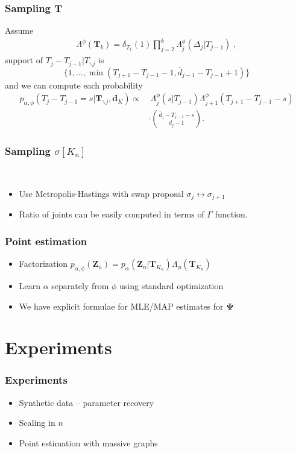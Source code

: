\documentclass[final,hyperref={pdfpagelabels=false},noamsthm]{beamer}
\def\aDist{\Lambda}
\newcommand{\ee}{Z} %
\newcommand{\bfee}{\mathbf{\ee}}
\newcommand{\bfT}{\mathbf{T}}
\newcommand{\bfPsi}{\boldsymbol{\Psi}}
\newcommand{\bfd}{\mathbf{d}}
\begin{document}
\begin{frame}
	\frametitle{Sampling $\bfT$}
	Assume
	\begin{align*}
	\aDist^{\phi}(\bfT_k) = \delta_{T_1}(1) \prod_{j=2}^k \aDist_j^{\phi}(\Delta_j | T_{j-1}) \;,
	\end{align*}
	support of $T_j - T_{j-1} | T_{\backslash j}$ is
	\begin{equation*}
		\{ 1, ..., \min(T_{j+1} - T_{j-1} - 1, \bar{d}_{j-1} - T_{j-1} + 1)  \}
	\end{equation*}
	and we can compute each probability
	\begin{align*}
		p_{\alpha, \phi}(T_j - T_{j-1} = s | \bfT_{\backslash j} , \bfd_{K}) \propto &\  \Lambda_j^\phi(s|T_{j-1})\Lambda_{j+1}^\phi (T_{j+1}-T_{j-1} - s) \\
		&\cdot \binom{\bar{d}_j - T_{j-1} - s}{d_j - 1}.
	\end{align*}
	
\end{frame}

\begin{frame}
	\frametitle{Sampling $\sigma[K_n]$}\

	\begin{itemize} 
	\item Use Metropolis-Hastings with swap proposal $\sigma_j \leftrightarrow \sigma_{j+1}$
	
	\item Ratio of joints can be easily computed in terms of $\Gamma$ function.
	\end{itemize}
\end{frame}

\begin{frame}
	\frametitle{Point estimation}
	\begin{itemize} 
	
		\item Factorization $p_{\alpha, \phi}(\bfee_n) = p_\alpha (\bfee_n | \bfT_{K_n})\Lambda_\phi(\bfT_{K_n})$ 

		\item Learn $\alpha$ separately from $\phi$ using standard optimization
	
		\item We have explicit formulae for MLE/MAP estimates for $\bfPsi$
	\end{itemize}
\end{frame}

\section{Experiments}
\begin{frame}
	\frametitle{Experiments}
	\begin{itemize}
		\item Synthetic data -- parameter recovery
		\item Scaling in $n$
		\item Point estimation with massive graphs
	\end{itemize}
\end{frame}
\end{document}
